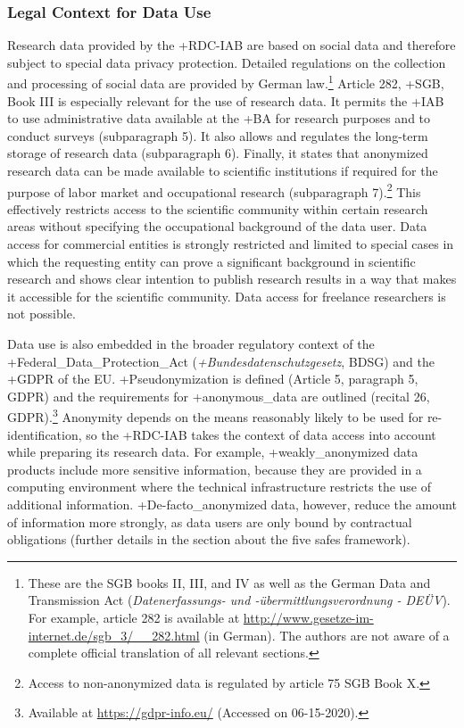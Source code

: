 \documentclass[
]{WileySix}
\begin{document}
\hypertarget{legal-context-for-data-use}{%
\subsubsection{Legal Context for Data Use}\label{legal-context-for-data-use}}

Research data provided by the +RDC-IAB\textbar{} are based on social data and therefore subject to special data privacy protection. Detailed regulations on the collection and processing of social data are provided by German law.\footnote{These are the SGB books II, III, and IV as well as the German Data and Transmission Act (\emph{Datenerfassungs- und -übermittlungsverordnung - DEÜV}). For example, article 282 is available at \url{http://www.gesetze-im-internet.de/sgb_3/__282.html} (in German). The authors are not aware of a complete official translation of all relevant sections.} Article 282, +SGB\textbar, Book III is especially relevant for the use of research data. It permits the +IAB\textbar{} to use administrative data available at the +BA\textbar{} for research purposes and to conduct surveys (subparagraph 5). It also allows and regulates the long-term storage of research data (subparagraph 6). Finally, it states that anonymized research data can be made available to scientific institutions if required for the purpose of labor market and occupational research (subparagraph 7).\footnote{Access to non-anonymized data is regulated by article 75 SGB Book X.} This effectively restricts access to the scientific community within certain research areas without specifying the occupational background of the data user. Data access for commercial entities is strongly restricted and limited to special cases in which the requesting entity can prove a significant background in scientific research and shows clear intention to publish research results in a way that makes it accessible for the scientific community. Data access for freelance researchers is not possible.

Data use is also embedded in the broader regulatory context of the +Federal\_Data\_Protection\_Act\textbar{} (\emph{+Bundesdatenschutzgesetz\textbar{}}, BDSG) and the +GDPR\textbar{} of the EU. +Pseudonymization\textbar{} is defined (Article 5, paragraph 5, GDPR) and the requirements for +anonymous\_data\textbar{} are outlined (recital 26, GDPR).\footnote{Available at \url{https://gdpr-info.eu/} (Accessed on 06-15-2020).} Anonymity depends on the means reasonably likely to be used for re-identification, so the +RDC-IAB\textbar{} takes the context of data access into account while preparing its research data. For example, +weakly\_anonymized\textbar{} data products include more sensitive information, because they are provided in a computing environment where the technical infrastructure restricts the use of additional information. +De-facto\_anonymized\textbar{} data, however, reduce the amount of information more strongly, as data users are only bound by contractual obligations (further details in the section about the five safes framework).
\end{document}
